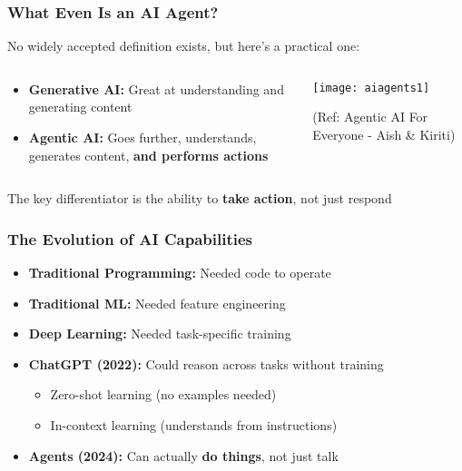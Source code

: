 \begin{frame}[fragile]\frametitle{What Even Is an AI Agent?}
No widely accepted definition exists, but here's a practical one:

\begin{columns}
    \begin{column}[T]{0.6\linewidth}
		\begin{itemize}
			\item \textbf{Generative AI:} Great at understanding and generating content
			\item \textbf{Agentic AI:} Goes further, understands, generates content, \textbf{and performs actions}
		\end{itemize}

    \end{column}
    \begin{column}[T]{0.4\linewidth}
        \begin{center}
        \texttt{[image: aiagents1]}
		
		{\tiny (Ref: Agentic AI For Everyone - Aish \& Kiriti)}
        \end{center}
    \end{column}
  \end{columns}
  
The key differentiator is the ability to \textbf{take action}, not just respond  
\end{frame}

\begin{frame}[fragile]\frametitle{The Evolution of AI Capabilities}
\begin{itemize}
    \item \textbf{Traditional Programming:} Needed code to operate
    \item \textbf{Traditional ML:} Needed feature engineering
    \item \textbf{Deep Learning:} Needed task-specific training
    \item \textbf{ChatGPT (2022):} Could reason across tasks without training
    \begin{itemize}
        \item Zero-shot learning (no examples needed)
        \item In-context learning (understands from instructions)
    \end{itemize}
    \item \textbf{Agents (2024):} Can actually \textbf{do things}, not just talk
\end{itemize}
\end{frame}

